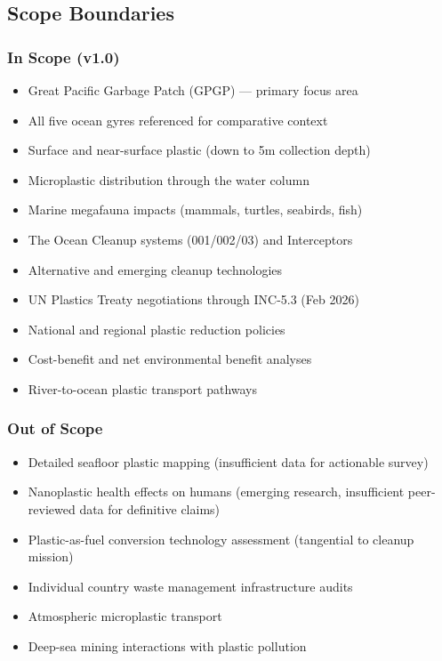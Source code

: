 \documentclass[11pt,letterpaper]{article}
\begin{document}
\subsection{Scope Boundaries}

\subsubsection{In Scope (v1.0)}
\begin{itemize}[leftmargin=2em]
\item Great Pacific Garbage Patch (GPGP) --- primary focus area
\item All five ocean gyres referenced for comparative context
\item Surface and near-surface plastic (down to 5m collection depth)
\item Microplastic distribution through the water column
\item Marine megafauna impacts (mammals, turtles, seabirds, fish)
\item The Ocean Cleanup systems (001/002/03) and Interceptors
\item Alternative and emerging cleanup technologies
\item UN Plastics Treaty negotiations through INC-5.3 (Feb 2026)
\item National and regional plastic reduction policies
\item Cost-benefit and net environmental benefit analyses
\item River-to-ocean plastic transport pathways
\end{itemize}

\subsubsection{Out of Scope}
\begin{itemize}[leftmargin=2em]
\item Detailed seafloor plastic mapping (insufficient data for actionable survey)
\item Nanoplastic health effects on humans (emerging research, insufficient peer-reviewed data for definitive claims)
\item Plastic-as-fuel conversion technology assessment (tangential to cleanup mission)
\item Individual country waste management infrastructure audits
\item Atmospheric microplastic transport
\item Deep-sea mining interactions with plastic pollution
\end{itemize}
\end{document}
